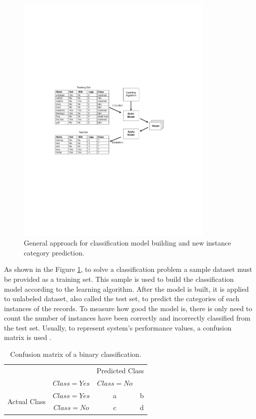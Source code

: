 \begin{figure}[!htp]
  \center
  \includegraphics[width=0.85\textwidth]{figures/classification_problem_solving}
  \caption{General approach for classification model building and new instance category prediction.}
  \label{fig:classification_problem}
\end{figure}

As shown in the Figure \ref{fig:classification_problem}, to solve a classification problem a sample dataset must be provided as a training set. This sample is used to build the classification model according to the learning algorithm. After the model is built, it is applied to unlabeled dataset, also called the test set, to predict the categories of each instances of the records. To measure how good the model is, there is only need to count the number of instances have been correctly and incorrectly classified from the test set. Usually, to represent system's performance values, a confusion matrix is used \cite{hamilton2000confusion}. 


\begin{table}[!htp]
\centering
\begin{tabular}{ |c|c|c|c| }
\hline
\multicolumn{2}{|c|}{} & \multicolumn{2}{c|}{Predicted Class} \\
\hhline{~~--}
\multicolumn{2}{|c|}{} & $Class = Yes$ & $Class = No$ \\ \hline
\multirow{2}{*}{Actual Class} & $Class = Yes$ & a & b \\
\hhline{~---}
& $Class = No$ & c & d \\
\hline
\end{tabular}
\caption{Confusion matrix of a binary classification.}
\label{tab:confusion_matrix}
\end{table}

